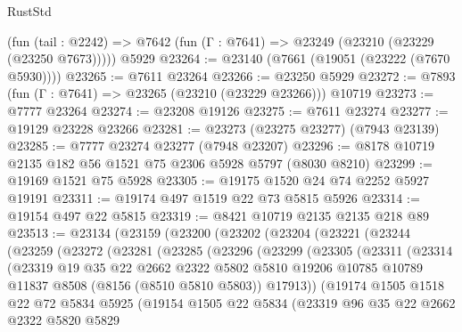 \begin{lexlean}{RustStd}
\begin{coremodule}
    (fun (tail : @2242) => @7642 (fun (Γ : @7641) => @23249 (@23210 (@23229 (@23250 @7673)))))
    @5929
@23264 := @23140 (@7661 (@19051 (@23222 (@7670 @5930))))
@23265 := @7611 @23264
@23266 := @23250 @5929
@23272 := @7893 (fun (Γ : @7641) => @23265 (@23210 (@23229 @23266))) @10719
@23273 := @7777 @23264
@23274 := @23208 @19126
@23275 := @7611 @23274
@23277 := @19129 @23228 @23266
@23281 := @23273 (@23275 @23277) (@7943 @23139)
@23285 := @7777 @23274 @23277 (@7948 @23207)
@23296 := @8178 @10719 @2135 @182 @56 @1521 @75 @2306 @5928 @5797 (@8030 @8210)
@23299 := @19169 @1521 @75 @5928
@23305 := @19175 @1520 @24 @74 @2252 @5927 @19191
@23311 := @19174 @497 @1519 @22 @73 @5815 @5926
@23314 := @19154 @497 @22 @5815
@23319 := @8421 @10719 @2135 @2135 @218 @89
@23513 := @23134
    (@23159
      (@23200
        (@23202
          (@23204
            (@23221
              (@23244
                (@23259
                  (@23272
                    (@23281
                      (@23285
                        (@23296
                          (@23299
                            (@23305
                              (@23311
                                (@23314
                                  (@23319
                                    @19
                                    @35
                                    @22
                                    @2662
                                    @2322
                                    @5802
                                    @5810
                                    @19206
                                    @10785
                                    @10789
                                    @11837
                                    @8508
                                    (@8156 (@8510 @5810 @5803))
                                    @17913))
                                (@19174
                                  @1505
                                  @1518
                                  @22
                                  @72
                                  @5834
                                  @5925
                                  (@19154
                                    @1505
                                    @22
                                    @5834
                                    (@23319
                                      @96
                                      @35
                                      @22
                                      @2662
                                      @2322
                                      @5820
                                      @5829

\end{coremodule}
\end{lexlean}
